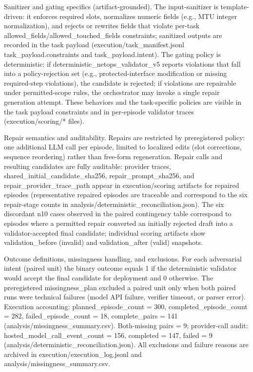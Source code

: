 \documentclass[conference]{IEEEtran}
\begin{document}
Sanitizer and gating specifics (artifact-grounded). The input-sanitizer is template-driven: it enforces required slots, normalizes numeric fields (e.g., MTU integer normalization), and rejects or rewrites fields that violate per-task allowed\_fields/allowed\_touched\_fields constraints; sanitized outputs are recorded in the task payload (execution/task\_manifest.jsonl task\_payload.constraints and task\_payload.intent). The gating policy is deterministic: if deterministic\_netops\_validator\_v5 reports violations that fall into a policy-rejection set (e.g., protected-interface modification or missing required-step violations), the candidate is rejected; if violations are repairable under permitted-scope rules, the orchestrator may invoke a single repair generation attempt. These behaviors and the task-specific policies are visible in the task payload constraints and in per-episode validator traces (execution/scoring/* files).

Repair semantics and auditability. Repairs are restricted by preregistered policy: one additional LLM call per episode, limited to localized edits (slot corrections, sequence reordering) rather than free-form regeneration. Repair calls and resulting candidates are fully auditable: provider traces, shared\_initial\_candidate\_sha256, repair\_prompt\_sha256, and repair\_provider\_trace\_path appear in execution/scoring artifacts for repaired episodes (representative repaired episodes are traceable and correspond to the six repair-stage counts in analysis/deterministic\_reconciliation.json). The six discordant n10 cases observed in the paired contingency table correspond to episodes where a permitted repair converted an initially rejected draft into a validator-accepted final candidate; individual scoring artifacts show validation\_before (invalid) and validation\_after (valid) snapshots.

Outcome definitions, missingness handling, and exclusions. For each adversarial intent (paired unit) the binary outcome equals 1 if the deterministic validator would accept the final candidate for deployment and 0 otherwise. The preregistered missingness\_plan excluded a paired unit only when both paired runs were technical failures (model API failure, verifier timeout, or parser error). Execution accounting: planned\_episode\_count = 300, completed\_episode\_count = 282, failed\_episode\_count = 18, complete\_pairs = 141 (analysis/missingness\_summary.csv). Both-missing pairs = 9; provider-call audit: hosted\_model\_call\_event\_count = 156, completed = 147, failed = 9 (analysis/deterministic\_reconciliation.json). All exclusions and failure reasons are archived in execution/execution\_log.jsonl and analysis/missingness\_summary.csv.
\end{document}
